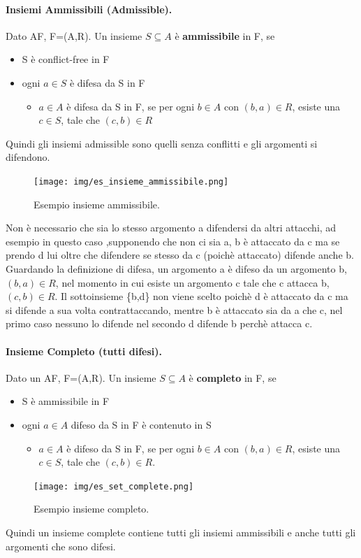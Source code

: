 \paragraph{Insiemi Ammissibili (Admissible).} Dato AF, F=(A,R). Un insieme $S \subseteq A$ è \textbf{ammissibile} in F, se 
\begin{itemize}
    \item S è conflict-free in F
    \item ogni $a\in S$ è difesa da S in F
    \begin{itemize}
        \item  $a\in A$ è difesa da S in F, se per ogni $b\in A$ con $(b,a) \in R$, esiste una $c\in S$, tale che $(c,b)\in R $
    \end{itemize}
\end{itemize}
Quindi gli insiemi admissible sono quelli senza conflitti e gli argomenti si difendono.
\begin{figure}[H]
    \centering
    \texttt{[image: img/es\_insieme\_ammissibile.png]}
    \caption{Esempio insieme ammissibile.}\label{fig:es_insieme_ammissibile}
\end{figure}
Non è necessario che sia lo stesso argomento a difendersi da altri attacchi, ad esempio in questo caso ,supponendo che non ci sia a, b è attaccato da c ma  se prendo d lui oltre che difendere se stesso da c (poichè attaccato) difende anche b. Guardando la definizione di difesa, un argomento a è difeso da un argomento b, $(b,a) \in R$, nel momento in cui esiste un argomento c tale che c attacca b, $(c,b) \in R$. Il sottoinsieme \{b,d\} non viene scelto poichè d è attaccato da c ma  si difende a sua volta contrattaccando, mentre b è attaccato sia da a che c, nel primo caso nessuno lo difende nel secondo d difende b perchè attacca c.

\paragraph{Insieme Completo (tutti difesi).} Dato un AF, F=(A,R). Un insieme $S \subseteq A$ è \textbf{completo} in F, se 
\begin{itemize}
    \item S è ammissibile in F
    \item ogni $a\in A$ difeso da S in F è contenuto in S
    \begin{itemize}
        \item $a\in A$ è difeso da S in F, se per ogni $b\in A$ con $(b,a) \in R$, esiste una $c\in S$, tale che $(c,b)\in R$.
    \end{itemize}
\end{itemize}
\begin{figure}[H]
    \centering
    \texttt{[image: img/es\_set\_complete.png]}
    \caption{Esempio insieme completo.}\label{fig:es_insieme_completo}
\end{figure}
Quindi un insieme complete contiene tutti gli insiemi ammissibili e anche tutti gli argomenti che sono difesi.

